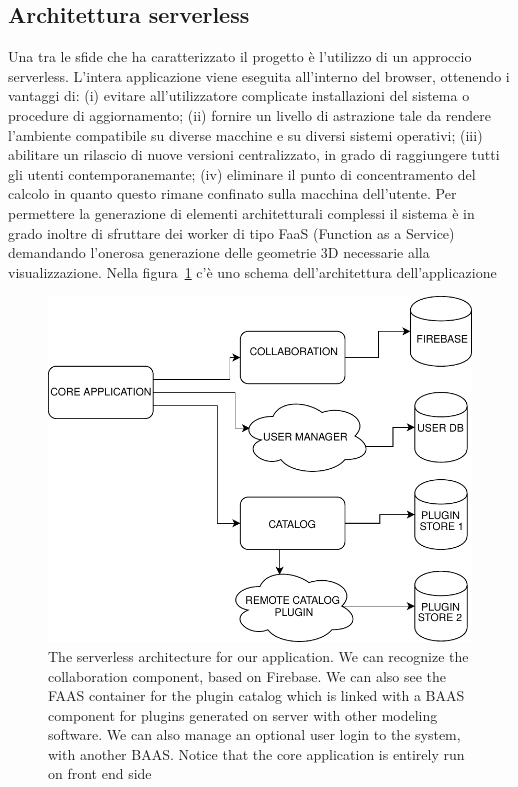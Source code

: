 \subsection{Architettura serverless}
Una tra le sfide che ha caratterizzato il progetto \`e l'utilizzo di un approccio serverless. L'intera applicazione viene eseguita all'interno del browser, ottenendo i vantaggi di: (i) evitare all'utilizzatore complicate installazioni del sistema o procedure di aggiornamento; (ii) fornire un livello di astrazione tale da rendere l'ambiente compatibile su diverse macchine e su diversi sistemi operativi; (iii) abilitare un rilascio di nuove versioni centralizzato, in grado di raggiungere tutti gli utenti contemporanemante; (iv) eliminare il punto di concentramento del calcolo in quanto questo rimane confinato sulla macchina dell'utente.
Per permettere la generazione di elementi architetturali complessi il sistema \`e in grado inoltre di sfruttare dei worker di tipo FaaS (Function as a Service) demandando l'onerosa generazione delle geometrie 3D necessarie alla visualizzazione. Nella figura~\ref{fig_serverless} c'\`e uno schema dell'architettura dell'applicazione
\begin{figure}[htb]
\centering
\includegraphics[width=\linewidth]{contents/images/serverless-diagram}

\caption{The serverless architecture for our application. We can recognize the collaboration component, based on Firebase. We can also see the FAAS container for the plugin catalog which is linked with a BAAS component for plugins generated on server with other modeling software. We can also manage an optional user login to the system, with another BAAS. Notice that the core application is entirely run on front end side}
\label{fig_serverless}
\end{figure}